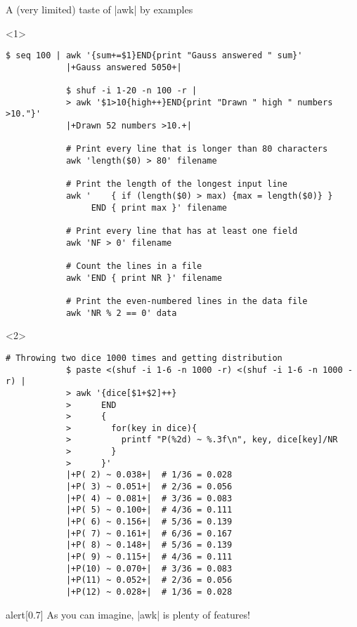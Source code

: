 \begin{frame}[fragile]{A (very limited) taste of \bash|awk| by examples}
    \vspace{-3mm}
    \begin{onlyenv}<1>
        \begin{lstlisting}[style=MyBash, numbers=none, xleftmargin=3mm, xrightmargin=3mm]
            $ seq 100 | awk '{sum+=$1}END{print "Gauss answered " sum}'
            |+Gauss answered 5050+|

            $ shuf -i 1-20 -n 100 -r |
            > awk '$1>10{high++}END{print "Drawn " high " numbers >10."}'
            |+Drawn 52 numbers >10.+|

            # Print every line that is longer than 80 characters
            awk 'length($0) > 80' filename

            # Print the length of the longest input line
            awk '    { if (length($0) > max) {max = length($0)} }
                 END { print max }' filename

            # Print every line that has at least one field
            awk 'NF > 0' filename

            # Count the lines in a file
            awk 'END { print NR }' filename

            # Print the even-numbered lines in the data file
            awk 'NR % 2 == 0' data
        \end{lstlisting}
    \end{onlyenv}
    \begin{onlyenv}<2>
        \begin{lstlisting}[style=MyBash, numbers=none, xleftmargin=3mm, xrightmargin=3mm, belowskip=-5mm]
            # Throwing two dice 1000 times and getting distribution
            $ paste <(shuf -i 1-6 -n 1000 -r) <(shuf -i 1-6 -n 1000 -r) |
            > awk '{dice[$1+$2]++}
            >      END
            >      {
            >        for(key in dice){
            >          printf "P(%2d) ~ %.3f\n", key, dice[key]/NR
            >        }
            >      }'
            |+P( 2) ~ 0.038+|  # 1/36 = 0.028
            |+P( 3) ~ 0.051+|  # 2/36 = 0.056
            |+P( 4) ~ 0.081+|  # 3/36 = 0.083
            |+P( 5) ~ 0.100+|  # 4/36 = 0.111
            |+P( 6) ~ 0.156+|  # 5/36 = 0.139
            |+P( 7) ~ 0.161+|  # 6/36 = 0.167
            |+P( 8) ~ 0.148+|  # 5/36 = 0.139
            |+P( 9) ~ 0.115+|  # 4/36 = 0.111
            |+P(10) ~ 0.070+|  # 3/36 = 0.083
            |+P(11) ~ 0.052+|  # 2/36 = 0.056
            |+P(12) ~ 0.028+|  # 1/36 = 0.028
        \end{lstlisting}
        \begin{varblock}{alert}[0.7\textwidth]{}
            \Large \alert{As you can imagine, \bash|awk| is plenty of features!}
        \end{varblock}
    \end{onlyenv}
\end{frame}

